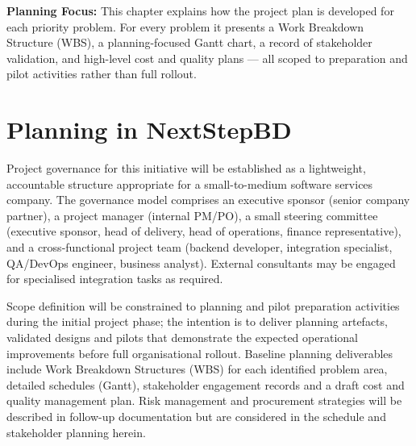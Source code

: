 \documentclass[12pt,a4paper]{report}
\begin{document}
\begin{highlightBox}
\textbf{Planning Focus:} This chapter explains how the project plan is developed for each priority problem. For every problem it presents a Work Breakdown Structure (WBS), a planning-focused Gantt chart, a record of stakeholder validation, and high-level cost and quality plans --- all scoped to preparation and pilot activities rather than full rollout.
\end{highlightBox}

\section{Planning in NextStepBD}
Project governance for this initiative will be established as a lightweight, accountable structure appropriate for a small-to-medium software services company. The governance model comprises an executive sponsor (senior company partner), a project manager (internal PM/PO), a small steering committee (executive sponsor, head of delivery, head of operations, finance representative), and a cross-functional project team (backend developer, integration specialist, QA/DevOps engineer, business analyst). External consultants may be engaged for specialised integration tasks as required.

Scope definition will be constrained to planning and pilot preparation activities during the initial project phase; the intention is to deliver planning artefacts, validated designs and pilots that demonstrate the expected operational improvements before full organisational rollout. Baseline planning deliverables include Work Breakdown Structures (WBS) for each identified problem area, detailed schedules (Gantt), stakeholder engagement records and a draft cost and quality management plan. Risk management and procurement strategies will be described in follow-up documentation but are considered in the schedule and stakeholder planning herein.
\end{document}
